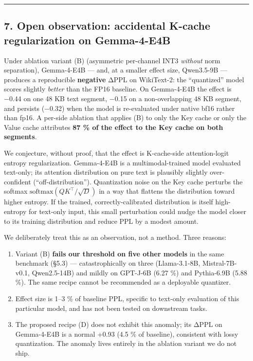 \documentclass[
]{article}
\providecommand{\tightlist}{%
  \setlength{\itemsep}{0pt}\setlength{\parskip}{0pt}}
\begin{document}
\begin{center}\rule{0.5\linewidth}{0.5pt}\end{center}

\subsection{7. Open observation: accidental K-cache regularization on
Gemma-4-E4B}\label{open-observation-accidental-k-cache-regularization-on-gemma-4-e4b}

Under ablation variant (B) (asymmetric per-channel INT3 \emph{without}
norm separation), Gemma-4-E4B --- and, at a smaller effect size,
Qwen3.5-9B --- produces a reproducible \textbf{negative} ΔPPL on
WikiText-2: the ``quantized'' model scores slightly \emph{better} than
the FP16 baseline. On Gemma-4-E4B the effect is −0.44 on one 48 KB text
segment, −0.15 on a non-overlapping 48 KB segment, and persists (−0.32)
when the model is re-evaluated under native bf16 rather than fp16. A
per-side ablation that applies (B) to only the Key cache or only the
Value cache attributes \textbf{87 \% of the effect to the Key cache on
both segments}.

We conjecture, without proof, that the effect is K-cache-side
attention-logit entropy regularization. Gemma-4-E4B is a
multimodal-trained model evaluated text-only; its attention distribution
on pure text is plausibly slightly over-confident
(``off-distribution''). Quantization noise on the Key cache perturbs the
softmax \(\mathrm{softmax}(QK^\top / \sqrt{D})\) in a way that flattens
the distribution toward higher entropy. If the trained,
correctly-calibrated distribution is itself high-entropy for text-only
input, this small perturbation could nudge the model closer to its
training distribution and reduce PPL by a modest amount.

We deliberately treat this as an observation, not a method. Three
reasons:

\begin{enumerate}
\def\labelenumi{\arabic{enumi}.}
\tightlist
\item
  Variant (B) \textbf{fails our threshold on five other models} in the
  same benchmark (§5.3) --- catastrophically on three (Llama-3.1-8B,
  Mistral-7B-v0.1, Qwen2.5-14B) and mildly on GPT-J-6B (6.27 \%) and
  Pythia-6.9B (5.88 \%). The same recipe cannot be recommended as a
  deployable quantizer.
\item
  Effect size is 1--3 \% of baseline PPL, specific to text-only
  evaluation of this particular model, and has not been tested on
  downstream tasks.
\item
  The proposed recipe (D) does not exhibit this anomaly; its ΔPPL on
  Gemma-4-E4B is a normal +0.93 (4.5 \% of baseline), consistent with
  lossy quantization. The anomaly lives entirely in the ablation variant
  we do not ship.
\end{enumerate}
\end{document}
